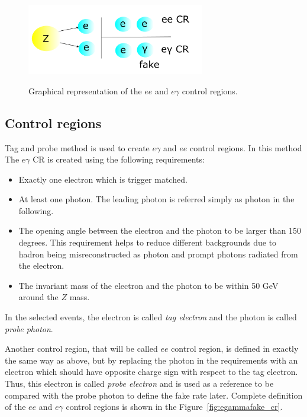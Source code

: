 \begin{figure}[!htbp]
\centering
{\includegraphics[width=0.69\textwidth]{figures/efake_CRs.png}}
\caption [] {Graphical representation of the $ee$ and $e\gamma$ control regions.}
\label{fig:egammafake_cr_toy}
\end{figure} 

\subsection{Control regions}
\label{sec:egammafakes_cr}
Tag and probe method is used to create $e\gamma$ and $ee$ control regions. In this method The $e\gamma$ CR is created using the following requirements:

\begin{itemize}
\item Exactly one electron which is trigger matched.
\item At least one photon. The leading \pt photon is referred simply as photon in the following.
\item The opening angle between the electron and the photon to be larger than 150 degrees. This requirement helps to reduce different backgrounds due to hadron being misreconstructed as photon and prompt photons radiated from the electron.
\item The invariant mass of the electron and the photon to be within 50 GeV around the $Z$ mass.
\end{itemize}
In the selected events, the electron is called \textit{tag electron} and the photon is called \textit{probe photon}.

Another control region, that will be called $ee$ control region, is defined in exactly the same way as above, but by replacing the photon in the requirements with an electron which should have opposite charge sign with respect to the tag electron. Thus, this electron is called \textit{probe electron} and is used as a reference to be compared with the probe photon to define the fake rate later. Complete definition of the $ee$ and $e\gamma$ control regions is shown in the Figure~\ref{fig:egammafake_cr}.

